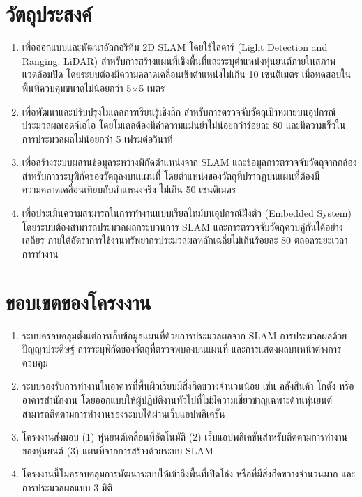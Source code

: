 \documentclass[a4paper,12pt]{report}
\begin{document}
\section{วัตถุประสงค์}

\begin{enumerate}[label=\arabic*., leftmargin=1.25cm, itemsep=6pt, topsep=6pt]
    \item เพื่อออกแบบและพัฒนาอัลกอริทึม 2D SLAM โดยใช้ไลดาร์
    (Light Detection and Ranging: LiDAR)
    สำหรับการสร้างแผนที่เชิงพื้นที่และระบุตำแหน่งหุ่นยนต์ภายในสภาพแวดล้อมปิด
    โดยระบบต้องมีความคลาดเคลื่อนเชิงตำแหน่งไม่เกิน 10 เซนติเมตร
    เมื่อทดสอบในพื้นที่ควบคุมขนาดไม่น้อยกว่า 5$\times$5 เมตร

    \item เพื่อพัฒนาและปรับปรุงโมเดลการเรียนรู้เชิงลึก
    สำหรับการตรวจจับวัตถุเป้าหมายบนอุปกรณ์ประมวลผลเอดจ์เอไอ
    โดยโมเดลต้องมีค่าความแม่นยำไม่น้อยกว่าร้อยละ 80
    และมีความเร็วในการประมวลผลไม่น้อยกว่า 5 เฟรมต่อวินาที

    \item เพื่อสร้างระบบผสานข้อมูลระหว่างพิกัดตำแหน่งจาก SLAM
    และข้อมูลการตรวจจับวัตถุจากกล้อง สำหรับการระบุพิกัดของวัตถุลงบนแผนที่
    โดยตำแหน่งของวัตถุที่ปรากฏบนแผนที่ต้องมีความคลาดเคลื่อนเทียบกับตำแหน่งจริง
    ไม่เกิน 50 เซนติเมตร

    \item เพื่อประเมินความสามารถในการทำงานแบบเรียลไทม์บนอุปกรณ์ฝังตัว
    (Embedded System) โดยระบบต้องสามารถประมวลผลกระบวนการ SLAM
    และการตรวจจับวัตถุควบคู่กันได้อย่างเสถียร
    ภายใต้อัตราการใช้งานทรัพยากรประมวลผลหลักเฉลี่ยไม่เกินร้อยละ 80
    ตลอดระยะเวลาการทำงาน
\end{enumerate}

\section{ขอบเขตของโครงงาน}

\begin{enumerate}[label=\arabic*., leftmargin=1.25cm, itemsep=6pt, topsep=6pt]
    \item ระบบครอบคลุมตั้งแต่การเก็บข้อมูลแผนที่ด้วยการประมวลผลจาก SLAM
    การประมวลผลด้วยปัญญาประดิษฐ์ การระบุพิกัดของวัตถุที่ตรวจพบลงบนแผนที่
    และการแสดงผลบนหน้าต่างการควบคุม

    \item ระบบรองรับการทำงานในอาคารที่พื้นผิวเรียบมีสิ่งกีดขวางจำนวนน้อย
    เช่น คลังสินค้า โกดัง หรืออาคารสำนักงาน
    โดยออกแบบให้ผู้ปฏิบัติงานทั่วไปที่ไม่มีความเชี่ยวชาญเฉพาะด้านหุ่นยนต์
    สามารถติดตามการทำงานของระบบได้ผ่านเว็บแอปพลิเคชัน

    \item โครงงานส่งมอบ (1) หุ่นยนต์เคลื่อนที่อัตโนมัติ
    (2) เว็บแอปพลิเคชันสำหรับติดตามการทำงานของหุ่นยนต์ (3) แผนที่จากการสร้างด้วยระบบ SLAM

    \item โครงงานนี้ไม่ครอบคลุมการพัฒนาระบบให้เข้าถึงพื้นที่เปิดโล่ง
    หรือที่มีสิ่งกีดขวางจำนวนมาก และการประมวลผลแบบ 3 มิติ
\end{enumerate}
\end{document}

